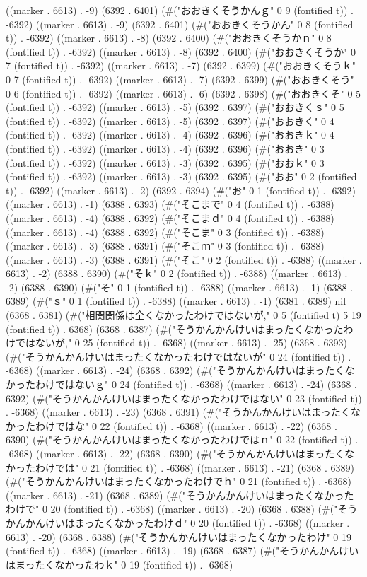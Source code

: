 ((marker . 6613) . -9) (6392 . 6401) (#("おおきくそうかんｇ" 0 9 (fontified t)) . -6392) ((marker . 6613) . -9) (6392 . 6401) (#("おおきくそうかん" 0 8 (fontified t)) . -6392) ((marker . 6613) . -8) (6392 . 6400) (#("おおきくそうかｎ" 0 8 (fontified t)) . -6392) ((marker . 6613) . -8) (6392 . 6400) (#("おおきくそうか" 0 7 (fontified t)) . -6392) ((marker . 6613) . -7) (6392 . 6399) (#("おおきくそうｋ" 0 7 (fontified t)) . -6392) ((marker . 6613) . -7) (6392 . 6399) (#("おおきくそう" 0 6 (fontified t)) . -6392) ((marker . 6613) . -6) (6392 . 6398) (#("おおきくそ" 0 5 (fontified t)) . -6392) ((marker . 6613) . -5) (6392 . 6397) (#("おおきくｓ" 0 5 (fontified t)) . -6392) ((marker . 6613) . -5) (6392 . 6397) (#("おおきく" 0 4 (fontified t)) . -6392) ((marker . 6613) . -4) (6392 . 6396) (#("おおきｋ" 0 4 (fontified t)) . -6392) ((marker . 6613) . -4) (6392 . 6396) (#("おおき" 0 3 (fontified t)) . -6392) ((marker . 6613) . -3) (6392 . 6395) (#("おおｋ" 0 3 (fontified t)) . -6392) ((marker . 6613) . -3) (6392 . 6395) (#("おお" 0 2 (fontified t)) . -6392) ((marker . 6613) . -2) (6392 . 6394) (#("お" 0 1 (fontified t)) . -6392) ((marker . 6613) . -1) (6388 . 6393) (#("そこまで" 0 4 (fontified t)) . -6388) ((marker . 6613) . -4) (6388 . 6392) (#("そこまｄ" 0 4 (fontified t)) . -6388) ((marker . 6613) . -4) (6388 . 6392) (#("そこま" 0 3 (fontified t)) . -6388) ((marker . 6613) . -3) (6388 . 6391) (#("そこｍ" 0 3 (fontified t)) . -6388) ((marker . 6613) . -3) (6388 . 6391) (#("そこ" 0 2 (fontified t)) . -6388) ((marker . 6613) . -2) (6388 . 6390) (#("そｋ" 0 2 (fontified t)) . -6388) ((marker . 6613) . -2) (6388 . 6390) (#("そ" 0 1 (fontified t)) . -6388) ((marker . 6613) . -1) (6388 . 6389) (#("ｓ" 0 1 (fontified t)) . -6388) ((marker . 6613) . -1) (6381 . 6389) nil (6368 . 6381) (#("相関関係は全くなかったわけではないが," 0 5 (fontified t) 5 19 (fontified t)) . 6368) (6368 . 6387) (#("そうかんかんけいはまったくなかったわけではないが," 0 25 (fontified t)) . -6368) ((marker . 6613) . -25) (6368 . 6393) (#("そうかんかんけいはまったくなかったわけではないが" 0 24 (fontified t)) . -6368) ((marker . 6613) . -24) (6368 . 6392) (#("そうかんかんけいはまったくなかったわけではないｇ" 0 24 (fontified t)) . -6368) ((marker . 6613) . -24) (6368 . 6392) (#("そうかんかんけいはまったくなかったわけではない" 0 23 (fontified t)) . -6368) ((marker . 6613) . -23) (6368 . 6391) (#("そうかんかんけいはまったくなかったわけではな" 0 22 (fontified t)) . -6368) ((marker . 6613) . -22) (6368 . 6390) (#("そうかんかんけいはまったくなかったわけではｎ" 0 22 (fontified t)) . -6368) ((marker . 6613) . -22) (6368 . 6390) (#("そうかんかんけいはまったくなかったわけでは" 0 21 (fontified t)) . -6368) ((marker . 6613) . -21) (6368 . 6389) (#("そうかんかんけいはまったくなかったわけでｈ" 0 21 (fontified t)) . -6368) ((marker . 6613) . -21) (6368 . 6389) (#("そうかんかんけいはまったくなかったわけで" 0 20 (fontified t)) . -6368) ((marker . 6613) . -20) (6368 . 6388) (#("そうかんかんけいはまったくなかったわけｄ" 0 20 (fontified t)) . -6368) ((marker . 6613) . -20) (6368 . 6388) (#("そうかんかんけいはまったくなかったわけ" 0 19 (fontified t)) . -6368) ((marker . 6613) . -19) (6368 . 6387) (#("そうかんかんけいはまったくなかったわｋ" 0 19 (fontified t)) . -6368) 